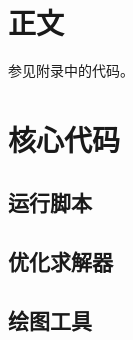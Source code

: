 \documentclass{article}
\begin{document}
\section{正文}
参见附录中的代码。

\newpage
\appendix
\section{核心代码}


\subsection{运行脚本}


\subsection{优化求解器}


\subsection{绘图工具}

\end{document}
